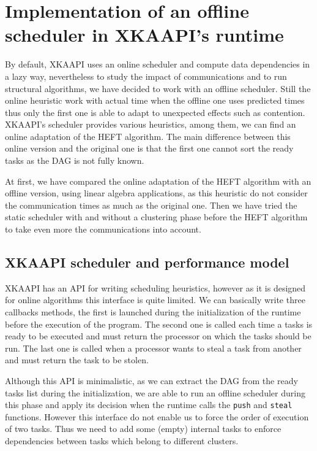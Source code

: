 \documentclass[10pt, conference, compsocconf,pdftex,dvipsnames]{IEEEtran}
\begin{document}
\section{Implementation of an offline scheduler in XKAAPI's runtime}
\label{sec:impl}

By default, XKAAPI uses an online scheduler and compute data dependencies in a
lazy way, nevertheless to study the impact of communications and to run
structural algorithms, we have decided to work with an offline scheduler.
Still the online heuristic work with actual time when the offline one uses
predicted times thus only the first one is able to adapt to unexpected effects
such as contention. XKAAPI's scheduler provides various heuristics, among
them, we can find an online adaptation of the HEFT algorithm. The main
difference between this online version and the original one is that the first
one cannot sort the ready tasks as the DAG is not fully known.

At first, we have compared the online adaptation of the HEFT algorithm with an
offline version, using linear algebra applications, as this heuristic do not
consider the communication times as much as the original one.  Then we have
tried the static scheduler with and without a clustering phase before the HEFT
algorithm to take even more the communications into account. 

\subsection{XKAAPI scheduler and performance model}
\label{sec:impl-kaapi}

XKAAPI has an API for writing scheduling heuristics, however as it is designed
for online algorithms this interface is quite limited. We can basically write
three callbacks methods, the first is launched during the initialization of
the runtime before the execution of the program. The second one is called each
time a tasks is ready to be executed and must return the processor on which
the tasks should be run. The last one is called when a processor wants to
steal a task from another and must return the task to be stolen.

Although this API is minimalistic, as we can extract the DAG from the ready
tasks list during the initialization, we are able to run an offline scheduler
during this phase and apply its decision when the runtime calls the
\texttt{push} and \texttt{steal} functions. However this interface do not
enable us to force the order of execution of two tasks. Thus we need to add
some (empty) internal tasks to enforce dependencies between tasks which belong
to different clusters.
\end{document}
